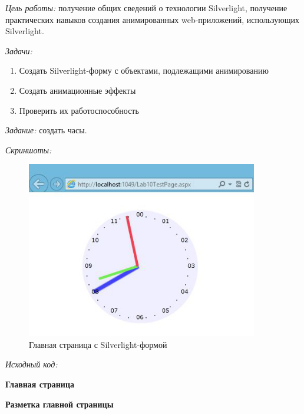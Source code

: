 \documentclass[pscyr, nonums]{hedlab}
\date{}
\begin{document}
    \makeheader
    \emph{Цель работы:} получение общих сведений о технологии Silverlight, получение практических навыков создания анимированных web-приложений, 
    использующих Silverlight.

    \emph{Задачи:}
    \begin{enumerate}\itemsep-5pt
        \item Создать Silverlight-форму с объектами, подлежащими анимированию
        \item Создать анимационные эффекты
        \item Проверить их работоспособность
    \end{enumerate}

    \emph{Задание:} создать часы.

    \emph{Скриншоты:}
    \begin{figure}[ht]
        \center
        \includegraphics[width=0.9\textwidth]{Lab10_01}
        \caption{Главная страница с Silverlight-формой}
    \end{figure}

    \pagebreak

    \emph{Исходный код:}
    \begin{center}
        \textbf{Главная страница}
    \end{center}
    

    \begin{center}
        \textbf{Разметка главной страницы}
    \end{center}
    
\end{document}
